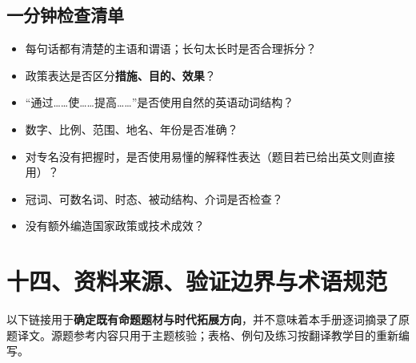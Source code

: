 \documentclass[a4paper,11pt,UTF8,fontset=none]{ctexart}
\begin{document}
\subsection{一分钟检查清单}

\begin{itemize}[leftmargin=1.7em,itemsep=1pt,parsep=0pt,topsep=2pt]
\item \noindent \fbox{\rule{0pt}{6pt}\rule{6pt}{0pt}} 每句话都有清楚的主语和谓语；长句太长时是否合理拆分？\par


\item \noindent \fbox{\rule{0pt}{6pt}\rule{6pt}{0pt}} 政策表达是否区分{\bfseries 措施、目的、效果}？\par


\item \noindent \fbox{\rule{0pt}{6pt}\rule{6pt}{0pt}} “通过……使……提高……”是否使用自然的英语动词结构？\par


\item \noindent \fbox{\rule{0pt}{6pt}\rule{6pt}{0pt}} 数字、比例、范围、地名、年份是否准确？\par


\item \noindent \fbox{\rule{0pt}{6pt}\rule{6pt}{0pt}} 对专名没有把握时，是否使用易懂的解释性表达（题目若已给出英文则直接用）？\par


\item \noindent \fbox{\rule{0pt}{6pt}\rule{6pt}{0pt}} 冠词、可数名词、时态、被动结构、介词是否检查？\par


\item \noindent \fbox{\rule{0pt}{6pt}\rule{6pt}{0pt}} 没有额外编造国家政策或技术成效？\par


\end{itemize}

\section{十四、资料来源、验证边界与术语规范}

\noindent 以下链接用于{\bfseries 确定既有命题题材与时代拓展方向}，并不意味着本手册逐词摘录了原题译文。源题参考内容只用于主题核验；表格、例句及练习按翻译教学目的重新编写。\par

\par
\end{document}
